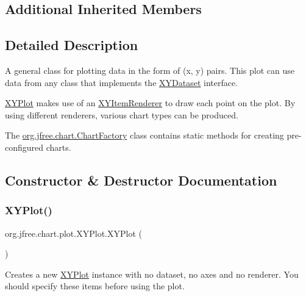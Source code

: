 \subsection*{Additional Inherited Members}


\subsection{Detailed Description}
A general class for plotting data in the form of (x, y) pairs. This plot can use data from any class that implements the \mbox{\hyperlink{}{X\+Y\+Dataset}} interface. 

{\ttfamily \mbox{\hyperlink{classorg_1_1jfree_1_1chart_1_1plot_1_1_x_y_plot}{X\+Y\+Plot}}} makes use of an \mbox{\hyperlink{}{X\+Y\+Item\+Renderer}} to draw each point on the plot. By using different renderers, various chart types can be produced. 

The \mbox{\hyperlink{classorg_1_1jfree_1_1chart_1_1_chart_factory}{org.\+jfree.\+chart.\+Chart\+Factory}} class contains static methods for creating pre-\/configured charts. 

\subsection{Constructor \& Destructor Documentation}
\mbox{\label{classorg_1_1jfree_1_1chart_1_1plot_1_1_x_y_plot_a0845016409bea095bd8e2f7ca81ea3ae}} 
\subsubsection{\texorpdfstring{X\+Y\+Plot()}{XYPlot()}\hspace{0.1cm}{\footnotesize\ttfamily [1/2]}}
{\footnotesize\ttfamily org.\+jfree.\+chart.\+plot.\+X\+Y\+Plot.\+X\+Y\+Plot (\begin{DoxyParamCaption}{ }\end{DoxyParamCaption})}

Creates a new {\ttfamily \mbox{\hyperlink{classorg_1_1jfree_1_1chart_1_1plot_1_1_x_y_plot}{X\+Y\+Plot}}} instance with no dataset, no axes and no renderer. You should specify these items before using the plot. \mbox{\label{classorg_1_1jfree_1_1chart_1_1plot_1_1_x_y_plot_a7e075881c7eac23b2937511a24a727b0}} 
